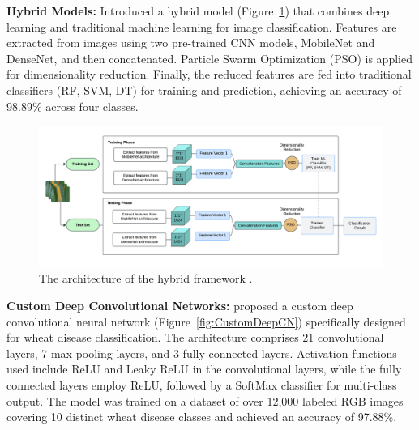 \textbf{Hybrid Models:} \parencite{nagpal2024hybrid} Introduced a hybrid model (Figure~\ref{fig:hybridframework}) that combines deep learning and traditional machine learning for image classification. Features are extracted from images using two pre-trained CNN models, MobileNet and DenseNet, and then concatenated. Particle Swarm Optimization (PSO) is applied for dimensionality reduction. Finally, the reduced features are fed into traditional classifiers (RF, SVM, DT) for training and prediction, achieving an accuracy of 98.89\% across four classes.


\begin{figure}[H] 
    \centering
    \includegraphics[width=1.5\textwidth]{chapters/chapter3/images/Figure04.png}
    \caption{The architecture of the hybrid framework \parencite{nagpal2024hybrid}.}
    \label{fig:hybridframework}
\end{figure}









\textbf{Custom Deep Convolutional Networks:} \parencite{goyal2021leaf} proposed a custom deep convolutional neural network (Figure~\ref{fig:CustomDeepCN}) specifically designed for wheat disease classification. The architecture comprises 21 convolutional layers, 7 max-pooling layers, and 3 fully connected layers. Activation functions used include ReLU and Leaky ReLU in the convolutional layers, while the fully connected layers employ ReLU, followed by a SoftMax classifier for multi-class output. The model was trained on a dataset of over 12,000 labeled RGB images covering 10 distinct wheat disease classes and achieved an accuracy of 97.88\%. 


